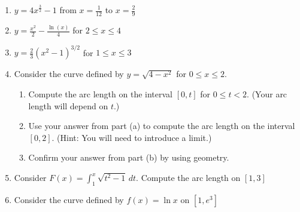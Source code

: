\documentclass[12pt]{article}
\newif\ifans
\begin{document}
\begin{enumerate}

\item $y=4x^{\frac{3}{2}}-1$ from $x=\frac{1}{12}$ to $x=\frac{2}{9}$ 

\ifans{\fbox{$\frac{19}{54}$}} \fi

\item $y = \frac{x^2}{2} - \frac{\ln(x)}{4}$ for $2 \leq x \leq 4$ 

\ifans{\fbox{$6+\frac{1}{4}\ln{2}$}} \fi

\item $y=\frac{2}{3}(x^2-1)^{3/2}$ for $1\leq x \leq 3$ 

\ifans{\fbox{$\frac{46}{3}$}} \fi

\item Consider the curve defined by $y = \sqrt{4-x^2}$ for $0 \leq x \leq 2$.

\begin{enumerate}

\item Compute the arc length on the interval $[0,t]$ for $0 \leq t <2$. (Your arc length will depend on $t$.)

\ifans{\fbox{$2\sin^{-1}{\left(\frac{t}{2}\right)}$}} \fi

\item Use your answer from part (a) to compute the arc length on the interval $[0,2]$. (Hint: You will need to introduce a limit.)

\ifans{\fbox{$\pi$}} \fi

\item Confirm your answer from part (b) by using geometry.

\ifans{\fbox{\parbox{1\linewidth}{On the interval $[0,2]$, the curve is $\frac{1}{4}$ of a circle with a radius of 2.  So, the length should be $\frac{1}{4}$  of the circumference; that is, $\text{Length} = \left.\frac{1}{4} \cdot 2 \pi r \right|_{r=2}= \frac{1}{4} \cdot 2 \pi (2) = \pi$.}}} \fi

\end{enumerate}

\item Consider $F(x)=\int_1^x \sqrt{t^2-1} \,dt$.  Compute the arc length on $[1,3]$

\ifans{\fbox{4}} \fi

\item Consider the curve defined by $f(x)=\ln{x}$ on $\left[1,e^3\right]$

\begin{enumerate}


\end{enumerate}
\end{enumerate}
\end{document}
